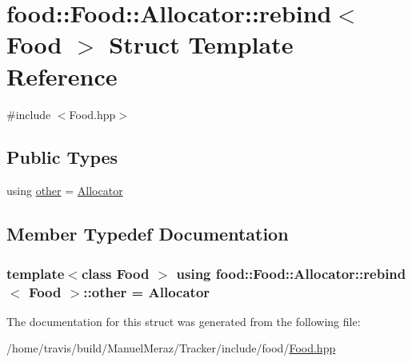 \hypertarget{structfood_1_1_food_1_1_allocator_1_1rebind}{}\section{food\+:\+:Food\+:\+:Allocator\+:\+:rebind$<$ Food $>$ Struct Template Reference}
\label{structfood_1_1_food_1_1_allocator_1_1rebind}


{\ttfamily \#include $<$Food.\+hpp$>$}

\subsection*{Public Types}
\begin{DoxyCompactItemize}
\item 
using \hyperlink{structfood_1_1_food_1_1_allocator_1_1rebind_a6393dfb2b28b3c0e63cbe6c97c8d879c}{other} = \hyperlink{structfood_1_1_food_1_1_allocator}{Allocator}
\end{DoxyCompactItemize}


\subsection{Member Typedef Documentation}
\subsubsection[{\texorpdfstring{other}{other}}]{\setlength{\rightskip}{0pt plus 5cm}template$<$class Food $>$ using {\bf food\+::\+Food\+::\+Allocator\+::rebind}$<$ {\bf Food} $>$\+::{\bf other} =  {\bf Allocator}}\hypertarget{structfood_1_1_food_1_1_allocator_1_1rebind_a6393dfb2b28b3c0e63cbe6c97c8d879c}{}\label{structfood_1_1_food_1_1_allocator_1_1rebind_a6393dfb2b28b3c0e63cbe6c97c8d879c}


The documentation for this struct was generated from the following file\+:\begin{DoxyCompactItemize}
\item 
/home/travis/build/\+Manuel\+Meraz/\+Tracker/include/food/\hyperlink{_food_8hpp}{Food.\+hpp}\end{DoxyCompactItemize}
